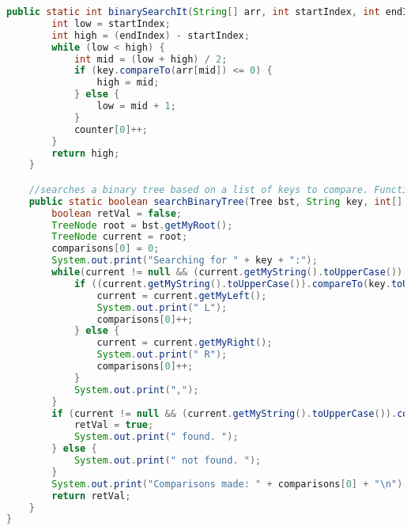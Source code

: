 \documentclass[letterpaper, 10pt,DIV=13]{scrartcl}
\numberwithin{equation}{section} %
\numberwithin{figure}{section} %
\numberwithin{table}{section} %
\begin{document}
\begin{lstlisting}[frame=single, language=java, breaklines]
    public static int binarySearchIt(String[] arr, int startIndex, int endIndex, String key, int[] counter) {
        int low = startIndex;
        int high = (endIndex) - startIndex;
        while (low < high) {
            int mid = (low + high) / 2;
            if (key.compareTo(arr[mid]) <= 0) {
                high = mid;
            } else {
                low = mid + 1;
            }
            counter[0]++;
        }
        return high;
    }

    //searches a binary tree based on a list of keys to compare. Functions very similarly to binary search due to the nature of a binary tree.
    public static boolean searchBinaryTree(Tree bst, String key, int[] comparisons) {
        boolean retVal = false;
        TreeNode root = bst.getMyRoot();
        TreeNode current = root;
        comparisons[0] = 0;
        System.out.print("Searching for " + key + ":");
        while(current != null && (current.getMyString().toUpperCase()).compareTo(key.toUpperCase()) != 0) {
            if ((current.getMyString().toUpperCase()).compareTo(key.toUpperCase()) > 0) {
                current = current.getMyLeft();
                System.out.print(" L");
                comparisons[0]++;
            } else {
                current = current.getMyRight();
                System.out.print(" R");
                comparisons[0]++;
            }
            System.out.print(",");
        }
        if (current != null && (current.getMyString().toUpperCase()).compareTo(key.toUpperCase()) == 0) {
            retVal = true;
            System.out.print(" found. ");
        } else {
            System.out.print(" not found. ");
        }
        System.out.print("Comparisons made: " + comparisons[0] + "\n");
        return retVal;
    }
}

\end{lstlisting}
\end{document}
